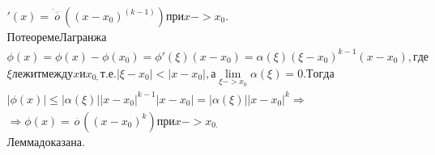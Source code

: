 \documentclass[a4paper]{article}
\begin{document}
\begin{equation*}
\begin{gathered}
'(x)=\overset{\underline{._{.....}}}{o}((x-x_0)^{(k-1)})\mathit{\text{п}\text{р}\text{и}}x->x_0.\\\mathit{\text{П}\text{о}}\mathit{\text{т}\text{е}\text{о}\text{р}\text{е}\text{м}\text{е}}\mathit{\text{Л}\text{а}\text{г}\text{р}\text{а}\text{н}\text{ж}\text{а}}\\\phi
(x)=\phi (x)-\phi (x_0)=\phi '(\xi )(x-x_0)=\alpha (\xi )(\xi -x_0)^{k-1}(x-x_0),\mathit{\text{г}\text{д}\text{е}}\\\xi
\mathit{\text{л}\text{е}\text{ж}\text{и}\text{т}}\mathit{\text{м}\text{е}\text{ж}\text{д}\text{у}}x\text{и}x_{0,}\mathit{\text{т}.}\mathit{\text{е}.}|\xi
-x_0|<|x-x_0|,\text{а}\lim _{\xi ->x_0}\alpha (\xi )=0.\mathit{\text{Т}\text{о}\text{г}\text{д}\text{а}}\\|\phi (x)|\le
|\alpha (\xi )||x-x_0|^{k-1}|x-x_0|=|\alpha (\xi )||x-x_0|^k\Rightarrow \\\Rightarrow \phi
(x)=\overset{\underline{\phantom{.\mathit{o.}}}}{o}((x-x_0)^k)\mathit{\text{п}\text{р}\text{и}}x->x_{0.}\\\mathit{\text{Л}\text{е}\text{м}\text{м}\text{а}}\mathit{\text{д}\text{о}\text{к}\text{а}\text{з}\text{а}\text{н}\text{а}.}\end{gathered}
\end{equation*}
\end{document}
